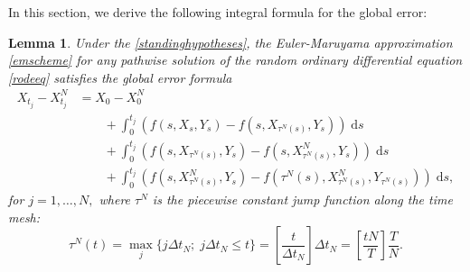 \documentclass[reqno,12pt]{amsart}
\theoremstyle{plain}%
\newtheorem{lem}{Lemma}[section]
\theoremstyle{definition}
\begin{document}
In this section, we derive the following integral formula for the global error:
\begin{lem}
    Under the \cref{standinghypotheses}, the Euler-Maruyama approximation \eqref{emscheme} for any pathwise solution of the random ordinary differential equation \eqref{rodeeq} satisfies the global error formula
    \begin{equation}
        \label{globalerrorintegralformula}
        \begin{aligned}
            X_{t_j} - X_{t_j}^N & = X_0 - X_0^N \\
            & \qquad + \int_0^{t_j} \left( f(s, X_s, Y_s) - f(s, X_{\tau^N(s)}, Y_s) \right)\;\mathrm{d}s  \\ 
            & \qquad + \int_{0}^{t_j} \left( f(s, X_{\tau^N(s)}, Y_s) - f(s, X_{\tau^N(s)}^N, Y_s) \right)\;\mathrm{d}s \\
            & \qquad + \int_0^{t_j} \left( f(s, X_{\tau^N(s)}^N, Y_s) - f(\tau^N(s), X_{\tau^N(s)}^N, Y_{\tau^N(s)}) \right)\;\mathrm{d}s,
        \end{aligned}
    \end{equation}
    for $j = 1, \ldots, N,$ where $\tau^N$ is the piecewise constant jump function along the time mesh:
    \begin{equation}
        \label{tauNt}
        \tau^N(t) = \max_j\{j\Delta t_N; \; j\Delta t_N \leq t\} = \left[\frac{t}{\Delta t_N}\right]\Delta t_N = \left[\frac{tN}{T}\right]\frac{T}{N}.
    \end{equation}
\end{lem}
\end{document}
